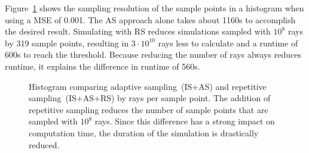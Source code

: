 Figure~\ref{plot:repetitive} shows the sampling resolution
of the sample points in a histogram when using a MSE of 0.001. 
The AS approach alone takes about 1160s to accomplish the desired result. Simulating with RS reduces
simulations sampled with $10^8$ rays by 319 sample points, resulting in 
$3\cdot10^{10}$ rays less to calculate and a runtime of 600s to reach the threshold. Because reducing the number of rays always
reduces runtime, it explains the difference in runtime
of 560s.
\begin{figure}[H]
  \centerline{
    }
  \caption{Histogram comparing adaptive sampling~(IS+AS) and repetitive
    sampling~(IS+AS+RS) by rays per sample point.  The addition of
    repetitive sampling reduces the number of sample points that are
    sampled with $10^8$ rays. Since this difference has a strong
    impact on computation time, the duration of the simulation is
    drastically reduced.}
  \label{plot:repetitive}
\end{figure}

